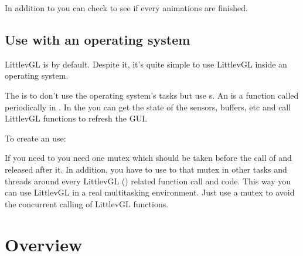 \documentclass[letterpaper,10pt,english]{sphinxmanual}
\begin{document}
In addition to  you can check  to see if every animations are finished.


\subsection{Use with an operating system}
\label{\detokenize{porting/os:use-with-an-operating-system}}\label{\detokenize{porting/os::doc}}
LittlevGL is  by default. Despite it, it’s quite simple to use LittlevGL inside an operating system.

The  is to don’t use the operating system’s tasks but use s. An  is a function called periodically in .
In the  you can get the state of the sensors, buffers, etc and call LittlevGL functions to refresh the GUI.

To create an  use:

\begin{sphinxVerbatim}[commandchars=\\\{\}]
   
\end{sphinxVerbatim}

If you need to  you need one mutex which should be taken before the call of  and released after it.
In addition, you have to use to that mutex in other tasks and threads around every LittlevGL () related function call and code.
This way you can use LittlevGL in a real multitasking environment. Just use a mutex to avoid the concurrent calling of LittlevGL functions.


\section{Overview}
\label{\detokenize{overview/index:overview}}\label{\detokenize{overview/index::doc}}
\end{document}
